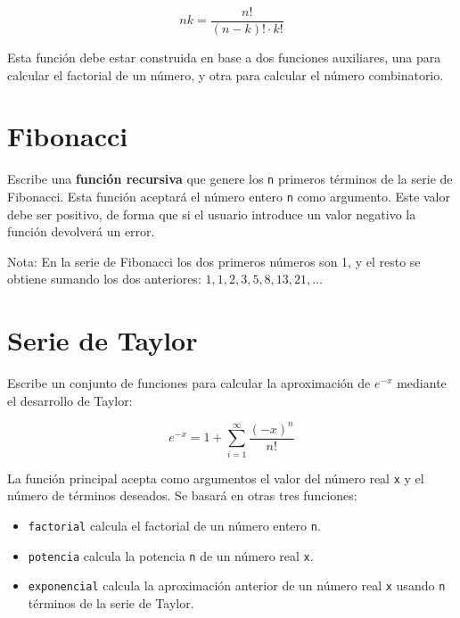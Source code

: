 \documentclass[a4paper]{article}
\begin{document}
\[
nk = \frac{n!}{(n - k)! \cdot k!}
\]

Esta función debe estar construida en base a dos funciones auxiliares, una para calcular el factorial de un número, y otra para calcular el número combinatorio.

\section{Fibonacci}
\label{sec:org064ed8c}

Escribe una \textbf{función recursiva} que genere los \texttt{n} primeros términos de la serie de Fibonacci. Esta función aceptará el número entero \texttt{n} como argumento. Este valor debe ser positivo, de forma que si el usuario introduce un valor negativo la función devolverá un error.

Nota: En la serie de Fibonacci los dos primeros números son 1, y el resto se obtiene sumando los dos anteriores: \(1, 1, 2, 3, 5, 8, 13, 21, \ldots\)

\section{Serie de Taylor}
\label{sec:orgdb1cac5}

Escribe un conjunto de funciones para calcular la aproximación de \(e ^ {-x}\) mediante el desarrollo de Taylor:

\[
 e^{-x} = 1 + \sum_{i = 1}^\infty \frac{(-x)^n}{n!}
 \]

La función principal acepta como argumentos el valor del número real \texttt{x} y el número de términos deseados. Se basará en otras tres funciones: 

\begin{itemize}
\item \texttt{factorial} calcula el factorial de un número entero \texttt{n}.

\item \texttt{potencia} calcula la potencia \texttt{n} de un número real \texttt{x}.

\item \texttt{exponencial} calcula la aproximación anterior de un número real \texttt{x} usando \texttt{n} términos de la serie de Taylor.
\end{itemize}
\end{document}
